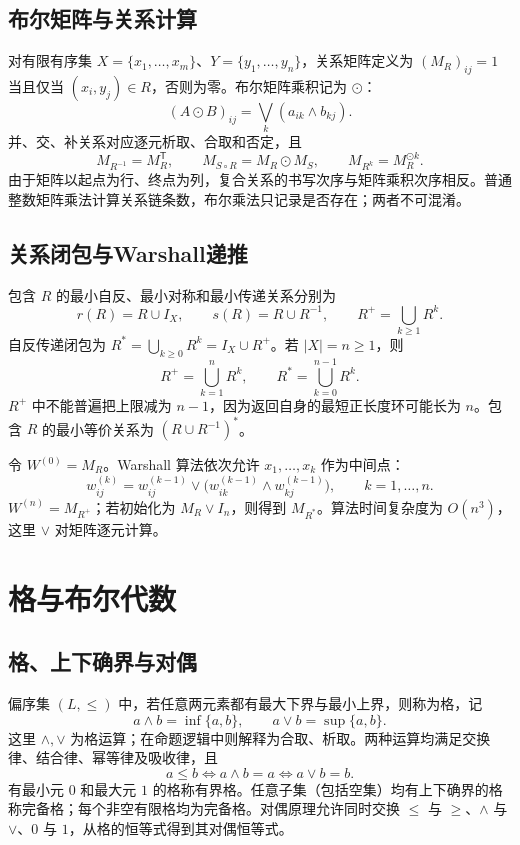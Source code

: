 \documentclass[../main.tex]{subfiles}
\begin{document}
\subsection{布尔矩阵与关系计算}
对有限有序集 $X=\{x_1,\ldots,x_m\}$、$Y=\{y_1,\ldots,y_n\}$，关系矩阵定义为 $(M_R)_{ij}=1$ 当且仅当 $(x_i,y_j)\in R$，否则为零。布尔矩阵乘积记为 $\odot$：
\[
(A\odot B)_{ij}=\bigvee_k(a_{ik}\land b_{kj}).
\]
并、交、补关系对应逐元析取、合取和否定，且
\[
M_{R^{-1}}=M_R^{\mathsf T},\qquad
M_{S\circ R}=M_R\odot M_S,\qquad
M_{R^k}=M_R^{\odot k}.
\]
由于矩阵以起点为行、终点为列，复合关系的书写次序与矩阵乘积次序相反。普通整数矩阵乘法计算关系链条数，布尔乘法只记录是否存在；两者不可混淆。

\subsection{关系闭包与Warshall递推}
包含 $R$ 的最小自反、最小对称和最小传递关系分别为
\[
r(R)=R\cup I_X,\qquad s(R)=R\cup R^{-1},\qquad
R^+=\bigcup_{k\ge1}R^k.
\]
自反传递闭包为 $R^*=\bigcup_{k\ge0}R^k=I_X\cup R^+$。若 $|X|=n\ge1$，则
\[
R^+=\bigcup_{k=1}^{n}R^k,\qquad
R^*=\bigcup_{k=0}^{n-1}R^k.
\]
$R^+$ 中不能普遍把上限减为 $n-1$，因为返回自身的最短正长度环可能长为 $n$。包含 $R$ 的最小等价关系为 $(R\cup R^{-1})^*$。

令 $W^{(0)}=M_R$。Warshall 算法依次允许 $x_1,\ldots,x_k$ 作为中间点：
\[
w_{ij}^{(k)}=w_{ij}^{(k-1)}\lor
\bigl(w_{ik}^{(k-1)}\land w_{kj}^{(k-1)}\bigr),\qquad k=1,\ldots,n.
\]
$W^{(n)}=M_{R^+}$；若初始化为 $M_R\lor I_n$，则得到 $M_{R^*}$。算法时间复杂度为 $O(n^3)$，这里 $\lor$ 对矩阵逐元计算。

\section{格与布尔代数}
\subsection{格、上下确界与对偶}
偏序集 $(L,\le)$ 中，若任意两元素都有最大下界与最小上界，则称为格，记
\[
a\land b=\inf\{a,b\},\qquad a\lor b=\sup\{a,b\}.
\]
这里 $\land,\lor$ 为格运算；在命题逻辑中则解释为合取、析取。两种运算均满足交换律、结合律、幂等律及吸收律，且
\[
a\le b\iff a\land b=a\iff a\lor b=b.
\]
有最小元 $0$ 和最大元 $1$ 的格称有界格。任意子集（包括空集）均有上下确界的格称完备格；每个非空有限格均为完备格。对偶原理允许同时交换 $\le$ 与 $\ge$、$\land$ 与 $\lor$、$0$ 与 $1$，从格的恒等式得到其对偶恒等式。
\end{document}
